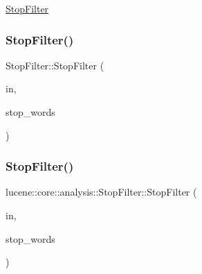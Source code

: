 \mbox{\hyperlink{classlucene_1_1core_1_1analysis_1_1StopFilter}{Stop\+Filter}} \mbox{\label{classlucene_1_1core_1_1analysis_1_1StopFilter_a86879713f0135ab08a996e716f87aadb}} 
\subsubsection{\texorpdfstring{Stop\+Filter()}{StopFilter()}\hspace{0.1cm}{\footnotesize\ttfamily [2/4]}}
{\footnotesize\ttfamily Stop\+Filter\+::\+Stop\+Filter (\begin{DoxyParamCaption}\item[{\mbox{\hyperlink{classlucene_1_1core_1_1analysis_1_1TokenStream}{Token\+Stream}} $\ast$}]{in,  }\item[{\mbox{\hyperlink{classlucene_1_1core_1_1analysis_1_1characterutil_1_1CharSet}{characterutil\+::\+Char\+Set}} \&\&}]{stop\+\_\+words }\end{DoxyParamCaption})}

\mbox{\label{classlucene_1_1core_1_1analysis_1_1StopFilter_a49efaebf256d312e5fef43b7322c1e52}} 
\subsubsection{\texorpdfstring{Stop\+Filter()}{StopFilter()}\hspace{0.1cm}{\footnotesize\ttfamily [3/4]}}
{\footnotesize\ttfamily lucene\+::core\+::analysis\+::\+Stop\+Filter\+::\+Stop\+Filter (\begin{DoxyParamCaption}\item[{std\+::shared\+\_\+ptr$<$ \mbox{\hyperlink{classlucene_1_1core_1_1analysis_1_1TokenStream}{Token\+Stream}} $>$}]{in,  }\item[{\mbox{\hyperlink{classlucene_1_1core_1_1analysis_1_1characterutil_1_1CharSet}{characterutil\+::\+Char\+Set}} \&}]{stop\+\_\+words }\end{DoxyParamCaption})}

